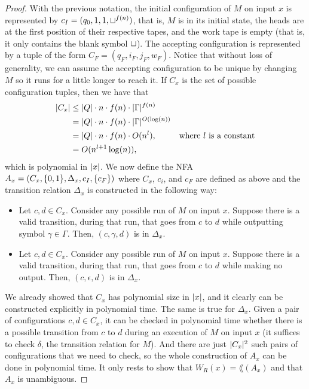 \documentclass[11pt,twoside=off,numbers=noenddot]{scrbook}
\begin{document}
\begin{proof}
    With the previous notation, the initial configuration of $M$ on input $x$ is represented by $c_I = (q_0, 1, 1, \sqcup^{f(n)})$, that is, $M$ is in its initial state, the heads are at the first position of their respective tapes, and the work tape is empty (that is, it only contains the blank symbol $\sqcup$). The accepting configuration is represented by a tuple of the form $C_F = (q_F, i_F, j_F, w_F)$. Notice that without loss of generality, we can assume the accepting configuration to be unique by changing $M$ so it runs for a little longer to reach it. If $C_x$ is the set of possible configuration tuples, then we have that
    \begin{align*}
        | C_x | & \leq | Q | \cdot n \cdot f(n) \cdot | \Gamma |^{f(n)}                                     \\
                   & = | Q | \cdot n \cdot f(n) \cdot | \Gamma |^{O(\log(n))}                                  \\
                   & = | Q | \cdot n \cdot f(n) \cdot O(n^l),                    & \text{where $l$ is a constant} \\
                   & = O(n^{l + 1} \log(n)),
    \end{align*}
    which is polynomial in $| x |$. We now define the NFA $A_x = (C_x, \{ 0, 1 \}, \Delta_x, c_I,\{ c_F \})$ where $C_x$, $c_i$, and $c_F$ are defined as above and the transition relation $\Delta_x$ is constructed in the following way:
    \begin{itemize}
        \item Let $c, d \in C_x$. Consider any possible run of $M$ on input $x$. Suppose there is a valid transition, during that run, that goes from $c$ to $d$ while outputting symbol $\gamma \in \Gamma$. Then, $(c, \gamma, d)$ is in $\Delta_x$.
        \item Let $c, d \in C_x$. Consider any possible run of $M$ on input $x$. Suppose there is a valid transition, during that run, that goes from $c$ to $d$ while making no output. Then, $(c, \epsilon, d)$ is in $\Delta_x$.
    \end{itemize}

    We already showed that $C_x$ has polynomial size in $| x |$, and it clearly can be constructed explicitly in polynomial time. The same is true for $\Delta_x$. Given a pair of configurations $c, d \in C_x$, it can be checked in polynomial time whether there is a possible transition from $c$ to $d$ during an execution of $M$ on input $x$ (it suffices to check $\delta$, the transition relation for $M$). And there are just $| C_x |^2$ such pairs of configurations that we need to check, so the whole construction of $A_x$ can be done in polynomial time. It only rests to show that $W_R(x) = \lang(A_x)$ and that $A_x$ is unambiguous.


\end{proof}
\end{document}
